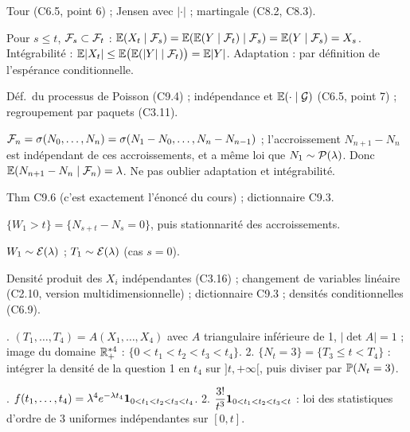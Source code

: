 \documentclass[11pt,a4paper]{article}
\begin{document}
\begin{exo}
\outils Tour (C6.5, point 6) ; Jensen avec $|\cdot|$ ; martingale (C8.2, C8.3).

\meth Pour $s\le t$, $\mathcal{F}_s\subset\mathcal{F}_t$ : $\mathbb{E}(X_t\mid\mathcal{F}_s)=\mathbb{E}(\mathbb{E}(Y\mid\mathcal{F}_t)\mid\mathcal{F}_s)=\mathbb{E}(Y\mid\mathcal{F}_s)=X_s$. Intégrabilité :
$\mathbb{E}|X_t|\le\mathbb{E}\bigl(\mathbb{E}(|Y|\mid\mathcal{F}_t)\bigr)=\mathbb{E}|Y|$. Adaptation : par définition de l'espérance conditionnelle.
\end{exo}

\begin{exo}
\outils Déf.\ du processus de Poisson (C9.4) ; indépendance et $\mathbb{E}(\cdot\mid\mathcal{G})$ (C6.5, point 7) ; regroupement par paquets (C3.11).

\meth $\mathcal{F}_n=\sigma(N_0,\dots,N_n)=\sigma(N_1-N_0,\dots,N_n-N_{n-1})$ ; l'accroissement $N_{n+1}-N_n$ est indépendant de ces
accroissements, et a même loi que $N_1\sim\mathcal{P}(\lambda)$. Donc $\mathbb{E}(N_{n+1}-N_n\mid\mathcal{F}_n)=\lambda$. Ne pas oublier adaptation et intégrabilité.
\end{exo}

\begin{exo}
\outils Thm C9.6 (c'est exactement l'énoncé du cours) ; dictionnaire C9.3.

\meth $\{W_1>t\}=\{N_{s+t}-N_s=0\}$, puis stationnarité des accroissements.

\rep $W_1\sim\mathcal{E}(\lambda)$ ; $T_1\sim\mathcal{E}(\lambda)$ (cas $s=0$).
\end{exo}

\begin{exo}
\outils Densité produit des $X_i$ indépendantes (C3.16) ; changement de variables linéaire (C2.10, version multidimensionnelle) ; dictionnaire C9.3 ;
densités conditionnelles (C6.9).

. $(T_1,\dots,T_4)=A(X_1,\dots,X_4)$ avec $A$ triangulaire inférieure de 1, $|\det A|=1$ ; image du domaine $\mathbb{R}_+^{*4}$ :
$\{0<t_1<t_2<t_3<t_4\}$. 2. $\{N_t=3\}=\{T_3\le t<T_4\}$ : intégrer la densité de la question 1 en $t_4$ sur $]t,+\infty[$, puis diviser
par $\mathbb{P}(N_t=3)$.

. $f(t_1,\dots,t_4)=\lambda^4e^{-\lambda t_4}\mathbf{1}_{0<t_1<t_2<t_3<t_4}$.
2. $\dfrac{3!}{t^3}\mathbf{1}_{0<t_1<t_2<t_3<t}$ : loi des statistiques d'ordre de 3 uniformes indépendantes sur $[0,t]$.
\end{exo}
\end{document}
